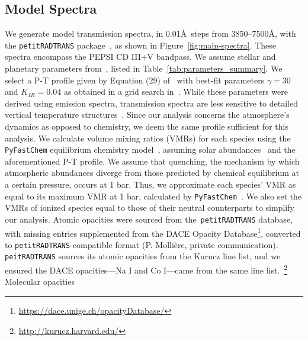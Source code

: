 \documentclass[twocolumn]{aastex631}
\newcommand{\code}[1]{\texttt{#1}}
\begin{document}
        \subsection{Model Spectra}\label{subsec:Model Spectra}
            We generate model transmission spectra, in 0.01\AA\ steps from 3850--7500\AA,  with the \code{petitRADTRANS} package~\citep{petitRADTRANS}, as shown in Figure~\ref{fig:main-spectra}. These spectra encompass the PEPSI CD III+V bandpass. We assume stellar and planetary parameters from~\citet{Lund2017}, listed in Table~\ref{tab:parameters_summary}. We select a P-T profile given by Equation (29) of~\citet{Guillot2010} with best-fit parameters $\gamma = 30$ and $K_{IR} = 0.04$ as obtained in a grid search in~\citet{Johnson2023}. While these parameters were derived using emission spectra, transmission spectra are less sensitive to detailed vertical temperature structures~\citep{Kesseli2020}. Since our analysis concerns the atmosphere's dynamics as opposed to chemistry, we deem the same profile sufficient for this analysis. 
            We calculate volume mixing ratios (VMRs) for each species using the \code{PyFastChem} equilibrium chemistry model~\citep{Stock2018, Stock2022, Kitzmann2023}, assuming solar abundances~\citep{Asplund2021} and the aforementioned P-T profile. We assume that quenching, the mechanism by which atmospheric abundances diverge from those predicted by chemical equilibrium at a certain pressure, occurs at 1 bar. Thus, we approximate each species' VMR as equal to its maximum VMR at 1 bar, calculated by \code{PyFastChem}~\citep{Johnson2023,Petz2023}. We also set the VMRs of ionized species equal to those of their neutral counterparts to simplify our analysis. 
            Atomic opacities were sourced from the~\code{petitRADTRANS} database, with missing entries supplemented from the DACE Opacity Database\footnote{\url{https://dace.unige.ch/opacityDatabase/}}, converted to \code{petitRADTRANS}-compatible format (P. Mollière, private communication). \code{peitRADTRANS} sources its atomic opacities from the Kurucz line list, and we ensured the DACE opacities---Na I and Co I---came from the same line list.~\footnote{\url{http://kurucz.harvard.edu/}} Molecular opacities 
        
\end{document}
